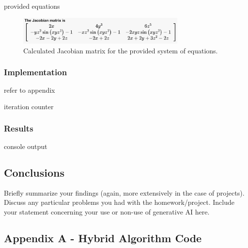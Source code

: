 \documentclass[10pt]{article}
\begin{document}
provided equations

\begin{figure}[h!]
\centering
\includegraphics[width=0.75\textwidth]{Jacobian.png}
\caption{Calculated Jacobian matrix for the provided system of equations.}
\end{figure}

\subsubsection*{Implementation}

refer to appendix 

iteration counter

\subsubsection*{Results}

console output

\pagebreak

\subsection*{Conclusions}
Briefly summarize your findings (again, more extensively in the case of projects).
Discuss any particular problems you had with the homework/project.
Include your statement concerning your use or non-use of generative AI here.

\pagebreak

\subsection*{Appendix A - Hybrid Algorithm Code}


\pagebreak

\end{document}
